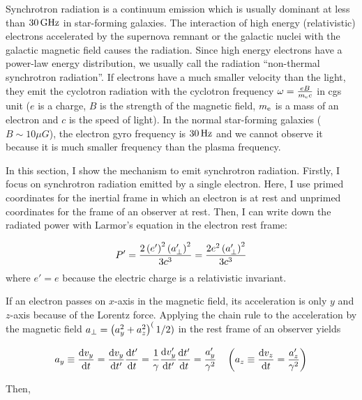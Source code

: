 Synchrotron radiation is a continuum emission which is usually dominant at less than $30\,\mathrm{GHz}$ in star-forming galaxies.
The interaction of high energy (relativistic) electrons accelerated by the supernova remnant or the galactic nuclei with the galactic magnetic field causes the radiation.
Since high energy electrons have a power-law energy distribution, we usually call the radiation ``non-thermal synchrotron radiation''.
If electrons have a much smaller velocity than the light, they emit the cyclotron radiation with the cyclotron frequency $\omega = \frac{eB}{m_{\mathrm{e}}c}$ in cgs unit ($e$ is a charge, $B$ is the strength of the magnetic field, $m_{\mathrm{e}}$ is a mass of an electron and $c$ is the speed of light).
In the normal star-forming galaxies ($B\sim10\mu G$), the electron gyro frequency is $30\,\mathrm{Hz}$ and we cannot observe it because it is much smaller frequency than the plasma frequency.

In this section, I show the mechanism to emit synchrotron radiation.
Firstly, I focus on synchrotron radiation emitted by a single electron.
Here, I use primed coordinates for the inertial frame in which an electron is at rest and unprimed coordinates for the frame of an observer at rest.
Then, I can write down the radiated power with Larmor's equation in the electron rest frame:

\begin{equation}\label{eq:essential_radio5n24}
    P^{\prime}=\frac{2\left(e^{\prime}\right)^{2}\left(a_{\perp}^{\prime}\right)^{2}}{3 c^{3}}=\frac{2 e^{2}\left(a_{\perp}^{\prime}\right)^{2}}{3 c^{3}}
\end{equation}
where $e'=e$ because the electric charge is a relativistic invariant.

If an electron passes on $x$-axis in the magnetic field, its acceleration is only $y$ and $z$-axis because of the Lorentz force.
Applying the chain rule to the acceleration by the magnetic field $a_{\perp} = \left(a^2_y + a^2_z\right)^(1/2)$ in the rest frame of an observer yields

\begin{equation}\label{eq:essential_radio5n25}
    a_y \equiv \frac{\mathrm{d} v_y}{\mathrm{d} t}=\frac{\mathrm{d} v_y}{\mathrm{d} t^{\prime}} \frac{\mathrm{d} t^{\prime}}{\mathrm{d} t}=\frac{1}{\gamma} \frac{\mathrm{d} v_y^{\prime}}{\mathrm{d} t^{\prime}} \frac{\mathrm{d} t^{\prime}}{\mathrm{d} t}=\frac{a_y^{\prime}}{\gamma^2}\ \ \ \left(a_z \equiv \frac{\mathrm{d} v_z}{\mathrm{d} t} = \frac{a'_z}{\gamma^2}\right)
\end{equation}

Then,

